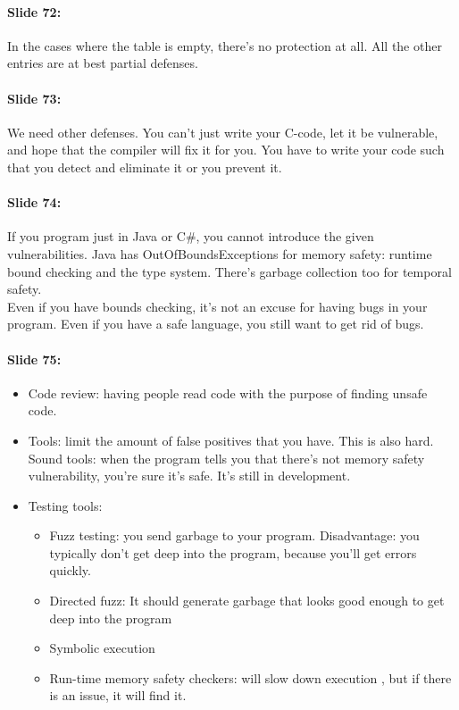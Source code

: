 \documentclass[10pt,a4paper]{report}
\begin{document}
\paragraph{Slide 72:} In the cases where the table is empty, there's no protection at all. All the other entries are at best partial defenses.

\paragraph{Slide 73:} We need other defenses. You can't just write your C-code, let it be vulnerable, and hope that the compiler will fix it for you. You have to write your code such that you detect and eliminate it or you prevent it.

\paragraph{Slide 74:} If you program just in Java or C\#, you cannot introduce the given vulnerabilities. Java has OutOfBoundsExceptions for memory safety: runtime bound checking and the type system. There's garbage collection too for temporal safety.\\
Even if you have bounds checking, it's not an excuse for having bugs in your program. Even if you have a safe language, you still want to get rid of bugs.

\paragraph{Slide 75:}
\begin{itemize}
\item Code review: having people read code with the purpose of finding unsafe code. 
\item Tools: limit the amount of false positives that you have. This is also hard. Sound tools: when the program tells you that there's not memory safety vulnerability, you're sure it's safe. It's still in development. 
\item Testing tools:
\begin{itemize}
\item Fuzz testing: you send garbage to your program. Disadvantage: you typically don't get deep into the program, because you'll get errors quickly. 
\item Directed fuzz: It should generate garbage that looks good enough to get deep into the program
\item Symbolic execution
\item Run-time memory safety checkers: will slow down execution
, but if there is an issue, it will find it. 
\end{itemize}
\end{itemize}
\end{document}
